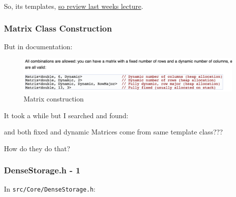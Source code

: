 So, its templates,
\href{http://development.rc.ucl.ac.uk/training/rcwithcpp/session02/}{so
review last weeks lecture}.

\subsubsection{Matrix Class
Construction}\label{matrix-class-construction}

But in documentation:

\begin{figure}[htbp]
\centering
\includegraphics{03cpplibraries/figures/eigenMatrixDynamic.png}
\caption{Matrix construction}
\end{figure}

It took a while but I searched and found:

\begin{Shaded}
\begin{Highlighting}[]
  \NormalTok{;}
\end{Highlighting}
\end{Shaded}

and both fixed and dynamic Matrices come from same template class???

How do they do that?

\subsubsection{DenseStorage.h - 1}\label{densestorage.h---1}

In \texttt{src/Core/DenseStorage.h}:

\begin{Shaded}
\end{Shaded}

